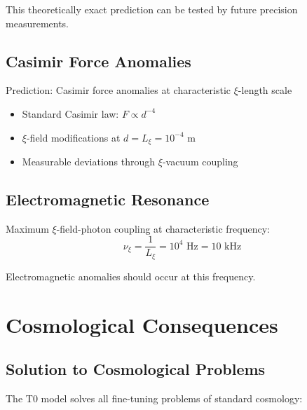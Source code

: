 \documentclass[12pt,a4paper]{article}
\begin{document}
	This theoretically exact prediction can be tested by future precision measurements.
	
	\subsection{Casimir Force Anomalies}
	
	\begin{experiment}
		Prediction: Casimir force anomalies at characteristic $\xi$-length scale
		\begin{itemize}
			\item Standard Casimir law: $F \propto d^{-4}$
			\item $\xi$-field modifications at $d = L_\xi = 10^{-4}$ m
			\item Measurable deviations through $\xi$-vacuum coupling
		\end{itemize}
	\end{experiment}
	
	\subsection{Electromagnetic Resonance}
	
	Maximum $\xi$-field-photon coupling at characteristic frequency:
	\begin{equation}
		\nu_\xi = \frac{1}{L_\xi} = 10^{4} \text{ Hz} = 10 \text{ kHz}
	\end{equation}
	
	Electromagnetic anomalies should occur at this frequency.
	
	\section{Cosmological Consequences}
	
	\subsection{Solution to Cosmological Problems}
	
	The T0 model solves all fine-tuning problems of standard cosmology:
	
\end{document}
